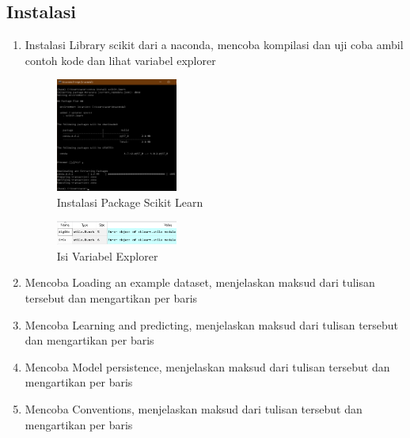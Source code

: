 \subsection{Instalasi}
\begin{enumerate}
	\item Instalasi Library scikit dari a naconda, mencoba kompilasi dan uji coba ambil contoh kode dan lihat variabel explorer
	\hfill\break
	\begin{figure}[H]
		\includegraphics[width=4cm]{figures/1174079/1/1.PNG}
		\centering
		\caption{Instalasi Package Scikit Learn}
	\end{figure}
	\begin{figure}[H]
		\includegraphics[width=4cm]{figures/1174079/1/2.png}
		\centering
		\caption{Isi Variabel Explorer}
	\end{figure}
	\item Mencoba Loading an example dataset, menjelaskan maksud dari tulisan tersebut dan mengartikan           		  per baris
	\hfill\break
	
	\item Mencoba Learning and predicting, menjelaskan maksud dari tulisan tersebut dan mengartikan per  			  baris
	\hfill\break
	
	\item  Mencoba Model persistence, menjelaskan maksud dari tulisan tersebut dan mengartikan per baris
	\hfill\break
	
	\item Mencoba Conventions, menjelaskan maksud dari tulisan tersebut dan mengartikan per baris
	\hfill\break
	
\end{enumerate}

